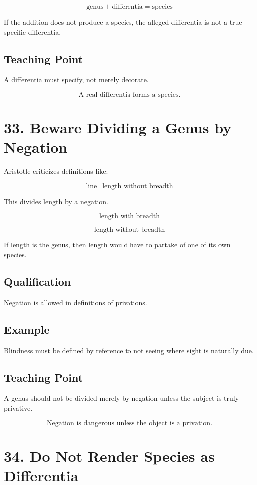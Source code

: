 \documentclass[12pt]{article}
\begin{document}
\[
\text{genus} + \text{differentia} = \text{species}
\]

If the addition does not produce a species, the alleged differentia is not a
true specific differentia.

\subsection*{Teaching Point}

A differentia must specify, not merely decorate.

\[
\boxed{
\text{A real differentia forms a species.}
}
\]

\section*{33. Beware Dividing a Genus by Negation}

Aristotle criticizes definitions like:

\[
\text{line} = \text{length without breadth}
\]

This divides length by a negation.

\[
\text{length with breadth}
\]

\[
\text{length without breadth}
\]

If length is the genus, then length would have to partake of one of its own
species.

\subsection*{Qualification}

Negation is allowed in definitions of privations.

\subsection*{Example}

Blindness must be defined by reference to not seeing where sight is naturally
due.

\subsection*{Teaching Point}

A genus should not be divided merely by negation unless the subject is truly
privative.

\[
\boxed{
\text{Negation is dangerous unless the object is a privation.}
}
\]

\section*{34. Do Not Render Species as Differentia}
\end{document}
